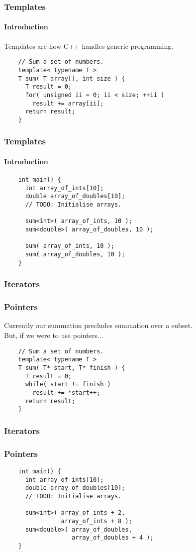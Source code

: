 \begin{frame}[fragile]
  \frametitle{Templates}
  \framesubtitle{Introduction}
  Templates are how C++ handles generic programming.
  \begin{example}
    \begin{lstlisting}
    // Sum a set of numbers.
    template< typename T >
    T sum( T array[], int size ) {
      T result = 0;
      for( unsigned ii = 0; ii < size; ++ii )
        result += array[ii];
      return result;
    }
    \end{lstlisting}
  \end{example}
\end{frame}

\begin{frame}[fragile]
  \frametitle{Templates}
  \framesubtitle{Introduction}
  \begin{example}
    \begin{lstlisting}
    int main() {
      int array_of_ints[10];
      double array_of_doubles[10];
      // TODO: Initialise arrays.

      sum<int>( array_of_ints, 10 );
      sum<double>( array_of_doubles, 10 );

      sum( array_of_ints, 10 );
      sum( array_of_doubles, 10 );
    }
    \end{lstlisting}
  \end{example}
\end{frame}

\begin{frame}[fragile]
  \frametitle{Iterators}
  \frametitle{Pointers}
  Currently our summation precludes summation over a subset. \\
  But, if we were to use pointers...
  \begin{example}
    \begin{lstlisting}
    // Sum a set of numbers.
    template< typename T >
    T sum( T* start, T* finish ) {
      T result = 0;
      while( start != finish )
        result += *start++;
      return result;
    }
    \end{lstlisting}
  \end{example}
\end{frame}

\begin{frame}[fragile]
  \frametitle{Iterators}
  \frametitle{Pointers}
  \begin{example}
    \begin{lstlisting}
    int main() {
      int array_of_ints[10];
      double array_of_doubles[10];
      // TODO: Initialise arrays.

      sum<int>( array_of_ints + 2,
                array_of_ints + 8 );
      sum<double>( array_of_doubles,
                   array_of_doubles + 4 );
    }
    \end{lstlisting}
  \end{example}
\end{frame}

